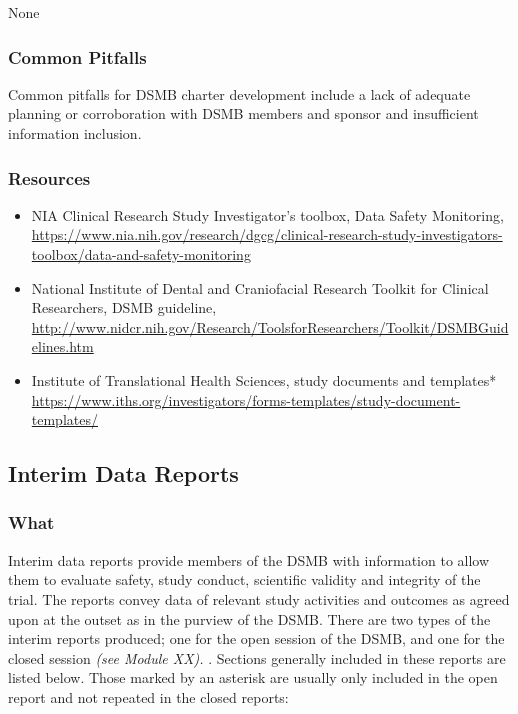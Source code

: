 \documentclass[]{book}
\begin{document}
None

\subsubsection{Common Pitfalls}\label{common-pitfalls-12}

Common pitfalls for DSMB charter development include a lack of adequate
planning or corroboration with DSMB members and sponsor and insufficient
information inclusion.

\subsubsection{Resources}\label{resources-14}

\begin{itemize}
\item
  NIA Clinical Research Study Investigator's toolbox, Data Safety
  Monitoring,
  \url{https://www.nia.nih.gov/research/dgcg/clinical-research-study-investigators-toolbox/data-and-safety-monitoring}
\item
  National Institute of Dental and Craniofacial Research Toolkit for
  Clinical Researchers, DSMB guideline,
  \url{http://www.nidcr.nih.gov/Research/ToolsforResearchers/Toolkit/DSMBGuidelines.htm}
\item
  Institute of Translational Health Sciences, study documents and
  templates*
  \url{https://www.iths.org/investigators/forms-templates/study-document-templates/}
\end{itemize}

\subsection{Interim Data Reports}\label{interim-data-reports}

\subsubsection{What}\label{what-15}

Interim data reports provide members of the DSMB with information to
allow them to evaluate safety, study conduct, scientific validity and
integrity of the trial. The reports convey data of relevant study
activities and outcomes as agreed upon at the outset as in the purview
of the DSMB. There are two types of the interim reports produced; one
for the open session of the DSMB, and one for the closed session
\emph{(see Module XX).} . Sections generally included in these reports
are listed below. Those marked by an asterisk are usually only included
in the open report and not repeated in the closed reports:
\end{document}
